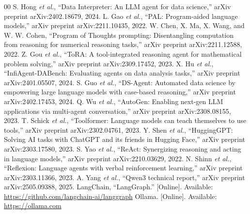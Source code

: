 \begin{thebibliography}{00}
 S. Hong \emph{et al.}, ``Data Interpreter: An LLM agent for data science,'' arXiv preprint arXiv:2402.18679, 2024.
 L. Gao \emph{et al.}, ``PAL: Program-aided language models,'' arXiv preprint arXiv:2211.10435, 2022.
 W. Chen, X. Ma, X. Wang, and W. W. Cohen, ``Program of Thoughts prompting: Disentangling computation from reasoning for numerical reasoning tasks,'' arXiv preprint arXiv:2211.12588, 2022.
 Z. Gou \emph{et al.}, ``ToRA: A tool-integrated reasoning agent for mathematical problem solving,'' arXiv preprint arXiv:2309.17452, 2023.
 X. Hu \emph{et al.}, ``InfiAgent-DABench: Evaluating agents on data analysis tasks,'' arXiv preprint arXiv:2401.05507, 2024.
 S. Guo \emph{et al.}, ``DS-Agent: Automated data science by empowering large language models with case-based reasoning,'' arXiv preprint arXiv:2402.17453, 2024.
 Q. Wu \emph{et al.}, ``AutoGen: Enabling next-gen LLM applications via multi-agent conversation,'' arXiv preprint arXiv:2308.08155, 2023.
 T. Schick \emph{et al.}, ``Toolformer: Language models can teach themselves to use tools,'' arXiv preprint arXiv:2302.04761, 2023.
 Y. Shen \emph{et al.}, ``HuggingGPT: Solving AI tasks with ChatGPT and its friends in Hugging Face,'' arXiv preprint arXiv:2303.17580, 2023.
 S. Yao \emph{et al.}, ``ReAct: Synergizing reasoning and acting in language models,'' arXiv preprint arXiv:2210.03629, 2022.
 N. Shinn \emph{et al.}, ``Reflexion: Language agents with verbal reinforcement learning,'' arXiv preprint arXiv:2303.11366, 2023.
 A. Yang \emph{et al.}, ``Qwen3 technical report,'' arXiv preprint arXiv:2505.09388, 2025.
 LangChain, ``LangGraph.'' [Online]. Available: \url{https://github.com/langchain-ai/langgraph}
 Ollama. [Online]. Available: \url{https://ollama.com}
\end{thebibliography}
